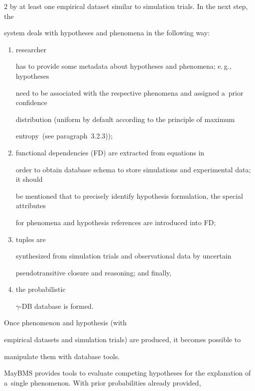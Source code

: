 \begin{multicols}{2}
by at least one empirical dataset similar to simulation trials. In the next step, the


system deals with hypotheses  and phenomena in the following way:


\begin{enumerate}[(1)]


\item researcher


has to provide some metadata about hypotheses and phenomena; e.\,g., hypotheses


need to be associated with the respective phenomena and assigned a~prior confidence


distribution (uniform by default according to the principle of maximum


entropy~(see paragraph~3.2.3));


\item functional dependencies (FD) are extracted from equations in


order to obtain database schema to store simulations and experimental data; it should


be mentioned that to precisely identify hypothesis formulation, the special attributes


for phenomena and hypothesis references are introduced into FD;


\item tuples are


synthesized from simulation trials and observational data by uncertain


  pseudotransitive closure and  reasoning; and finally,


  \item  the probabilistic


  $\gamma$-DB database is formed.


  \end{enumerate}





   Once phenomenon and hypothesis (with


empirical datasets and simulation trials) are produced, it becomes possible to


manipulate them with database tools.





  MayBMS provides tools to evaluate competing hypotheses for the explanation of a~single phenomenon. With prior probabilities already provided,



\end{multicols}
